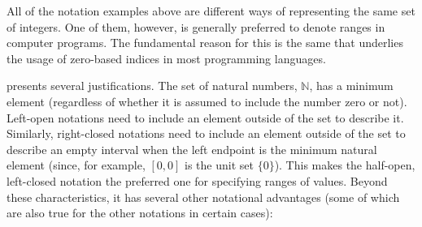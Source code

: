 All of the notation examples above are different ways of representing the same
set of integers.  One of them, however, is generally preferred to denote ranges
in computer programs.  The fundamental reason for this is the same that
underlies the usage of zero-based indices in most programming
languages\footnotemark.


\cite{Dijkstra1982} presents several justifications.  The set of natural
numbers, $\mathbb{N}$\footnotemark, has a minimum element (regardless of whether
it is assumed to include the number zero or not).  Left-open notations need to
include an element outside of the set to describe it.  Similarly, right-closed
notations need to include an element outside of the set to describe an empty
interval when the left endpoint is the minimum natural element (since, for
example, $[0, 0]$ is the unit set $\{0\}$).  This makes the half-open,
left-closed notation the preferred one for specifying ranges of values.  Beyond
these characteristics, it has several other notational advantages (some of which
are also true for the other notations in certain cases):


